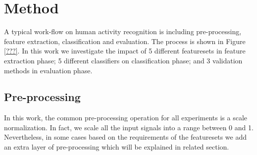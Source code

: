 \documentclass[journal,article,submit,moreauthors,pdftex]{Definitions/mdpi}
\begin{document}
\section{Method}
A typical work-flow on human activity recognition is including pre-processing, feature extraction, classification and evaluation. The process is shown in Figure \ref{???}. In this work we investigate the impact of 5 different featuresets in feature extraction phase; 5 different classifiers on classification phase; and 3 validation methods in evaluation phase.
\subsection{Pre-processing}
In this work, the common pre-processing operation for all experiments is a scale normalization. In fact, we scale all the input signals into a range between 0 and 1. Nevertheless, in some cases based on the requirements of the featuresets we add an extra layer of pre-processing which will be explained in related section.
\end{document}
